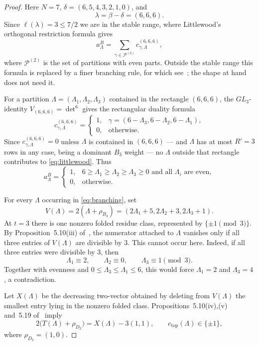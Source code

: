 \documentclass[11pt]{amsart}
\theoremstyle{remark}
\newcommand{\ctop}{c_{\mathrm{top}}}
\newcommand{\Ptwo}{\mathcal P^{(2)}}
\begin{document}
\begin{proof}
Here $N=7$, $\delta=(6,5,4,3,2,1,0)$, and
\[
\lambda=\beta-\delta=(6,6,6).
\]
Since $\ell(\lambda)=3\le 7/2$ we are in the stable range, where
Littlewood's orthogonal restriction formula gives
\begin{equation}\label{eq:littlewood}
a^B_\Lambda
=
\sum_{\gamma\in\Ptwo}
c^{(6,6,6)}_{\gamma,\Lambda},
\end{equation}
where $\Ptwo$ is the set of partitions with even parts. Outside the stable
range this formula is replaced by a finer branching rule, for which
see~\cite{JangKwon}; the shape at hand does not need it.

For a partition
$\Lambda=(\Lambda_1,\Lambda_2,\Lambda_3)$ contained in the rectangle
$(6,6,6)$, the $GL_3$-identity
$V_{(6,6,6)}=\det^6$ gives the rectangular duality formula
\[
c^{(6,6,6)}_{\gamma,\Lambda}
=
\begin{cases}
1,
&
\gamma=(6-\Lambda_3,6-\Lambda_2,6-\Lambda_1),
\\
0,
&
\text{otherwise}.
\end{cases}
\]
Since $c^{(6,6,6)}_{\gamma,\Lambda}=0$ unless $\Lambda$ is contained in
$(6,6,6)$ --- and $\Lambda$ has at most $R'=3$ rows in any case, being a
dominant $B_3$ weight --- no $\Lambda$ outside that rectangle contributes to
\eqref{eq:littlewood}. Thus
\begin{equation}\label{eq:branching}
a^B_\Lambda
=
\begin{cases}
1,
&
6\ge\Lambda_1\ge\Lambda_2\ge\Lambda_3\ge0
\text{ and all }\Lambda_i\text{ are even},
\\
0,
&
\text{otherwise}.
\end{cases}
\end{equation}

For every $\Lambda$ occurring in \eqref{eq:branching}, set
\[
V(\Lambda)
=
2(\Lambda+\rho_{B_3})
=
(2\Lambda_1+5,2\Lambda_2+3,2\Lambda_3+1).
\]
At $t=3$ there is one nonzero folded residue class, represented by
$\{\pm1\pmod3\}$. By Proposition~5.10(iii) of~\cite{Marin}, the
numerator attached to $\Lambda$ vanishes only if all three entries of
$V(\Lambda)$ are divisible by $3$. This cannot occur here. Indeed,
if all three entries were divisible by $3$, then
\[
\Lambda_1\equiv2,\qquad
\Lambda_2\equiv0,\qquad
\Lambda_3\equiv1
\pmod3.
\]
Together with evenness and
$0\le\Lambda_3\le\Lambda_1\le6$, this would force
$\Lambda_1=2$ and $\Lambda_3=4$, a contradiction.

Let $X(\Lambda)$ be the decreasing two-vector obtained by deleting
from $V(\Lambda)$ the smallest entry lying in the nonzero folded
class. Propositions~5.10(iv),(v) and~5.19 of~\cite{Marin} imply
\begin{equation}\label{eq:top}
2\bigl(T(\Lambda)+\rho_{D_2}\bigr)
=
X(\Lambda)-3(1,1),
\qquad
\ctop(\Lambda)\in\{\pm1\},
\end{equation}
where $\rho_{D_2}=(1,0)$.


\end{proof}
\end{document}
